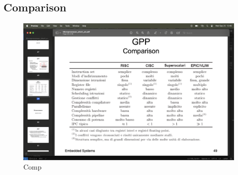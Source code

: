 \subsection{Comparison}
\begin{figure}[H]
    \centering
    \includegraphics[width=0.75\linewidth]{images/comparison.png}
    \caption{Comp}
\end{figure}
